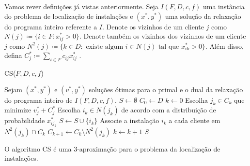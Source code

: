 Vamos rever definições já vistas anteriormente. 
Seja $I(F,D,c,f)$ uma instância do problema de localização de instalações e $(x^*,y^*)$ uma solução da relaxação do programa inteiro referente a $I$. 
Denote os vizinhos de um cliente $j$ como $N(j) \coloneqq\{i \in F : x^*_{ij} > 0\}$. 
Denote também os vizinhos dos vizinhos de um cliente $j$ como $N^2(j) \coloneqq \{ k \in D : \text{ existe algum } i \in N(j) \text{ tal que } x^*_{ik} > 0\}$.
Além disso, defina $C^*_j \coloneqq \sum_{i \in F} c_{ij}x^*_{ij}$ .

\begin{algorithm}[tbh]
\caption{CS($F,D,c,f$)}
\begin{algorithmic}[1]
        \State Sejam $(x^*,y^*)$ e $(v^*,y^*)$ soluções ótimas para o primal e o dual da relaxação do programa inteiro de $I(F,D,c,f)$.
        \State $S \gets \emptyset$
        \State $C_0 \gets D$
        \State $k \gets 0$
        \State Escolha $j_k \in C_k$ que minimize $v^*_j + C^*_j$
        \State Escolha $i_k \in N(j_k)$ de acordo com a distribuição de probabilidade $x^*_{ij_k}$
        \State $S \gets S \cup \{i_k\}$
        \State Associe a instalação $i_k$ a cada cliente em $N^2(j_k) \cap C_k$
        \State $C_{k+1} \gets C_k \setminus N^2(j_k)$
        \State $k \gets k +1$
        \EndWhile
        \State \Return $S$
\end{algorithmic}
\end{algorithm}

\begin{theorem} O algoritmo {\sc CS} é uma 3-aproximação para o problema da localização de instalações.
\end{theorem}

